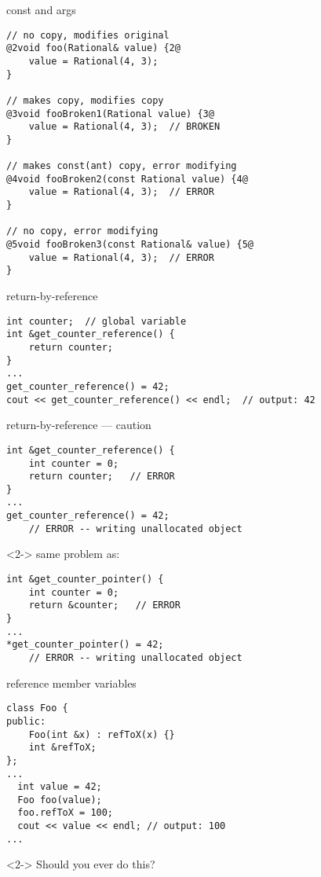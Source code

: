 \begin{frame}[fragile,label=constReferneces]{const and args}
    \vspace{-.75cm}
\begin{lstlisting}
// no copy, modifies original 
@2void foo(Rational& value) {2@
    value = Rational(4, 3);
}

// makes copy, modifies copy
@3void fooBroken1(Rational value) {3@
    value = Rational(4, 3);  // BROKEN
}

// makes const(ant) copy, error modifying
@4void fooBroken2(const Rational value) {4@
    value = Rational(4, 3);  // ERROR
}

// no copy, error modifying
@5void fooBroken3(const Rational& value) {5@
    value = Rational(4, 3);  // ERROR
}
\end{lstlisting}
\end{frame}

\begin{frame}[fragile,label=returnByRef]{return-by-reference}
\lstset{language=C++,style=small}
\begin{lstlisting}
int counter;  // global variable
int &get_counter_reference() {
    return counter;
}
...
get_counter_reference() = 42;
cout << get_counter_reference() << endl;  // output: 42
\end{lstlisting}
\end{frame}

\begin{frame}[fragile,label=returnByRefCaution]{return-by-reference --- caution}
\lstset{language=C++,style=small}
\begin{lstlisting}
int &get_counter_reference() {
    int counter = 0;
    return counter;   // ERROR
}
...
get_counter_reference() = 42; 
    // ERROR -- writing unallocated object
\end{lstlisting}
\begin{visibleenv}<2->
same problem as:
\begin{lstlisting}
int &get_counter_pointer() {
    int counter = 0;
    return &counter;   // ERROR
}
...
*get_counter_pointer() = 42; 
    // ERROR -- writing unallocated object
\end{lstlisting}
\end{visibleenv}
\end{frame}

\begin{frame}[fragile,label=refMemVars]{reference member variables}
\lstset{language=C++,style=small}
\begin{lstlisting}
class Foo {
public:
    Foo(int &x) : refToX(x) {}
    int &refToX;
};
...
  int value = 42;
  Foo foo(value);
  foo.refToX = 100;
  cout << value << endl; // output: 100
...
\end{lstlisting}
\begin{visibleenv}<2->
Should you ever do this? 
\end{visibleenv}
\end{frame}
